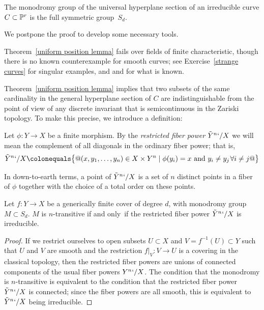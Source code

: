 \begin{theorem}
\label{uniform position lemma}%
%
The
monodromy group of the universal hyperplane section of an irreducible
curve $C \subset {\mathbb P}^r$ is the full symmetric group~$S_d$.
%
\end{theorem}

We postpone the proof to develop some necessary tools.

Theorem~\ref{uniform position lemma} fails over fields of finite
characteristic, though there is no known counterexample for smooth
curves; see Exercise~\ref{strange curves} for singular examples, and
\cite{Rathmann} and \cite{Kadets} for what is known.

Theorem~\ref{uniform position lemma} implies that two subsets of the
same cardinality in the general hyperplane section of $C$
are indistinguishable from the point of view of any discrete invariant
that is semicontinuous in the Zariski topology. To make this precise,
we introduce a definition:

\begin{definition}
Let $\phi : Y \to X$ be a finite morphism. By the
\emph{restricted fiber power}
%
$\tilde Y^n`/X$ we will mean the complement of all diagonals in
the ordinary fiber power; that is,
$$
\tilde Y^n`/X \colonequals  \bigl\{@ (x, y_1,\dots, y_n) \in X \times Y^n \mid
\phi(y_i) = x \text{ and } y_i \neq y_j \; \forall i \neq j @\bigr\}
$$
\end{definition}

In down-to-earth terms, a point of $\tilde Y^n`/X$ is a set of $n$
distinct points in a fiber of $\phi$ together with
the choice of a total order on these points.

\begin{lemma}\label{transitivity lemma}
Let $f : Y \to X$ be a generically finite cover of degree $d$, with
monodromy group $M \subset S_d$.
$M$ is $n$-transitive if and only~if the restricted fiber power $\tilde
Y^n`/X$ is irreducible.
\end{lemma}

\begin{proof}
If we restrict ourselves to open subsets $U \subset X$ and $V = f^{-1}(U)
\subset Y$ such that $U$ and $V$ are smooth and the restriction $f|_V :
V \to U$ is a covering in the classical topology, then the restricted
fiber powers are unions of connected components of the usual fiber
powers $Y^n`/X$. The condition that the monodromy is $n$-transitive is
equivalent to the condition that the restricted fiber power $\tilde Y^n`/X$
is connected; since the fiber powers are all smooth, this is equivalent
to $\tilde Y^n`/X$ being irreducible.
\end{proof}



